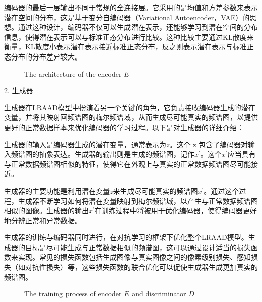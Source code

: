 
编码器的最后一层输出不同于常规的全连接层。它采用的是均值和方差参数来表示潜在空间的分布，这是基于变分自编码器（Variational Autoencoder，VAE）的思想。通过这种设计，编码器不仅可以生成潜在表示，还能够学习到潜在空间的分布信息，使得潜在表示可以与标准正态分布进行比较。这种比较主要通过KL散度来衡量，KL散度小表示潜在表示接近标准正态分布，反之则表示潜在表示与标准正态分布的分布差异较大。

\begin{figure}[H]
    \centering
    \def\svgwidth{0.8\textwidth}
    
    \caption{The architecture of the encoder $E$}
    \label{fig:encoder}
\end{figure}

2. 生成器


生成器在LRAAD模型中扮演着另一个关键的角色，它负责接收编码器生成的潜在变量，并将其映射回频谱图的梅尔频谱域，从而生成尽可能真实的频谱图，以提供更好的正常数据样本来优化编码器的学习过程。以下是对生成器的详细介绍：

生成器的输入是编码器生成的潜在变量，通常表示为$z$。这个 z 包含了编码器对输入频谱图的抽象表达。生成器的输出则是生成的频谱图，记作$x^\prime$。这个$x^\prime$应当具有与正常数据频谱图相似的特征，使得它在外观上与真实的正常数据频谱图尽可能接近。

生成器的主要功能是利用潜在变量$z$来生成尽可能真实的频谱图$x^\prime$。通过这个过程，生成器不断学习如何将潜在变量映射到梅尔频谱域，以产生与正常数据频谱图相似的图像。生成器的输出$x^\prime$在训练过程中将被用于优化编码器，使得编码器更好地分辨正常和异常数据。

生成器的训练与编码器同时进行，在对抗学习的框架下优化整个LRAAD模型。生成器的目标是尽可能生成与正常数据相似的频谱图，这可以通过设计适当的损失函数来实现。常见的损失函数包括生成图像与真实图像之间的像素级别损失、感知损失（如对抗性损失）等，这些损失函数的联合优化可以促使生成器生成更加真实的频谱图。

\begin{figure}[H]
    \centering
    \def\svgwidth{\textwidth}
    
    \caption{The training process of encoder $E$ and discriminator $D$}
    \label{fig:lraad}
\end{figure}

